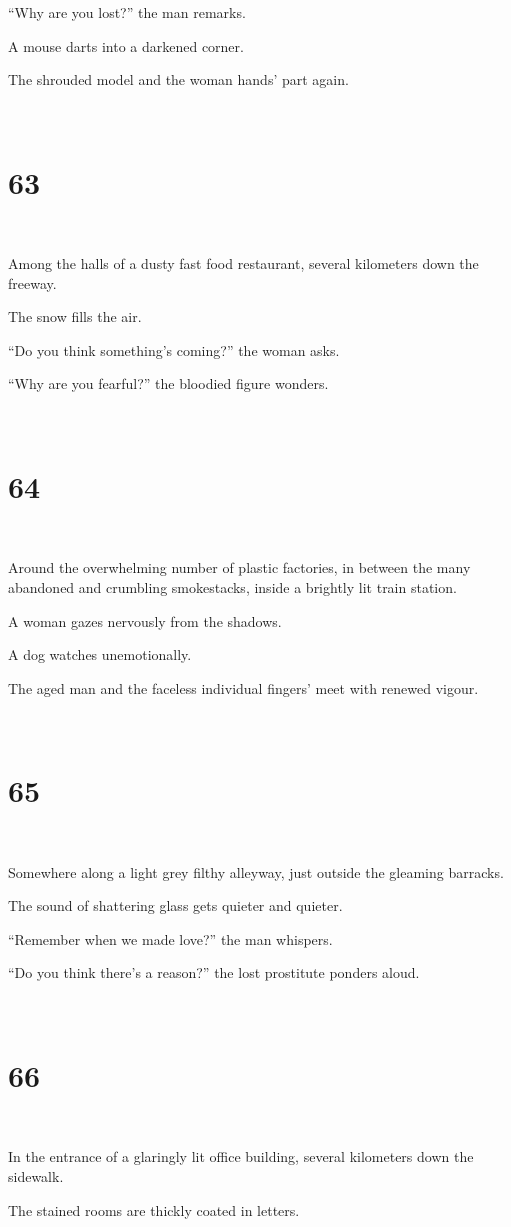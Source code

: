 \documentclass{report}
\begin{document}
``Why are you lost?'' the man remarks.

A mouse darts into a darkened corner.

The shrouded model and the woman hands' part again.

~
\chapter*{63}
~

Among the halls of a dusty fast food restaurant, several kilometers down the freeway.

The snow fills the air.

``Do you think something's coming?'' the woman asks.

``Why are you fearful?'' the bloodied figure wonders.

~
\chapter*{64}
~

Around the overwhelming number of plastic factories, in between the many abandoned and crumbling smokestacks, inside a brightly lit train station.

A woman gazes nervously from the shadows.

A dog watches unemotionally.

The aged man and the faceless individual fingers' meet with renewed vigour.

~
\chapter*{65}
~

Somewhere along a light grey filthy alleyway, just outside the gleaming barracks.

The sound of shattering glass gets quieter and quieter.

``Remember when we made love?'' the man whispers.

``Do you think there's a reason?'' the lost prostitute ponders aloud.

~
\chapter*{66}
~

In the entrance of a glaringly lit office building, several kilometers down the sidewalk.

The stained rooms are thickly coated in letters.
\end{document}
